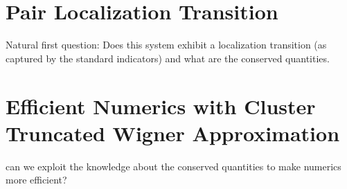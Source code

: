 \chapter{Pair Localization Transition}

Natural first question: Does this system exhibit a localization transition (as captured by the standard indicators) and what are the conserved quantities.



\chapter{Efficient Numerics with Cluster Truncated Wigner Approximation}

can we exploit the knowledge about the conserved quantities to make numerics more efficient?

